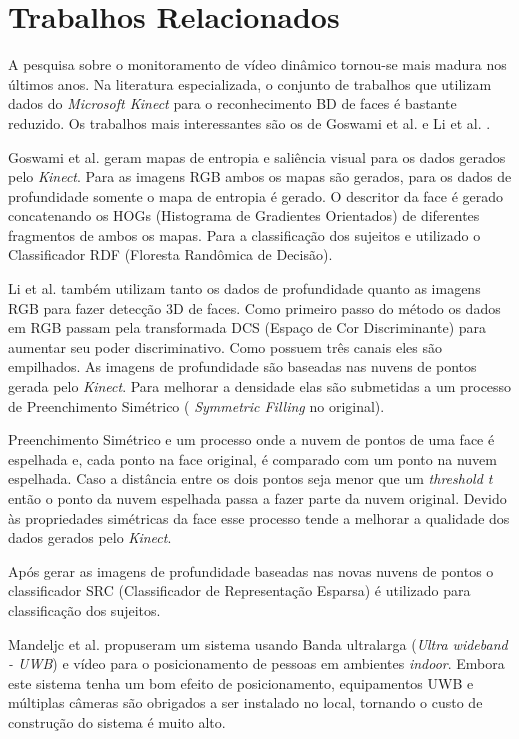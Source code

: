 \section{Trabalhos Relacionados}\label{sec:trabalhos-relacionados}

A pesquisa sobre o monitoramento de vídeo dinâmico tornou-se mais madura nos últimos anos. Na literatura especializada, o conjunto de trabalhos que utilizam dados do
\textit{Microsoft Kinect} para o reconhecimento BD de faces é bastante reduzido. Os trabalhos mais interessantes são os de Goswami et al. \cite{goswami2013rgb} e Li et al. \cite{li2013using}.

Goswami et al. \cite{goswami2013rgb} geram mapas de entropia e saliência visual para os dados gerados pelo \textit{Kinect}. Para as imagens RGB ambos os mapas são gerados, para os dados de profundidade somente o mapa de entropia é gerado. O descritor da face é gerado concatenando os HOGs (Histograma de Gradientes Orientados) de diferentes fragmentos de ambos os mapas. Para a classificação dos sujeitos e utilizado o Classificador RDF (Floresta Randômica de Decisão).
 
Li et al. \cite{goswami2013rgb} também utilizam tanto os dados de profundidade quanto as imagens RGB para fazer detecção 3D de faces. Como primeiro passo do método os dados em RGB passam pela transformada DCS (Espaço de Cor Discriminante) para aumentar seu poder discriminativo. Como possuem três canais eles são empilhados. As imagens de profundidade são baseadas nas nuvens de pontos gerada pelo  \textit{Kinect}. Para melhorar a densidade elas são submetidas a um processo de Preenchimento Simétrico ( \textit{Symmetric Filling} no original).
 
Preenchimento Simétrico e um processo onde a nuvem de pontos de uma face é espelhada e, cada ponto na face original, é comparado com um ponto na nuvem espelhada. Caso a distância entre os dois pontos seja menor que um  \textit{threshold t} então o ponto da nuvem espelhada passa a fazer parte da nuvem original. Devido às propriedades simétricas da face esse processo tende a melhorar a qualidade dos dados gerados pelo \textit{Kinect}.
 
Após gerar as imagens de profundidade baseadas nas novas nuvens de pontos o classificador SRC (Classificador de Representação Esparsa) é utilizado para classificação dos sujeitos.
 
Mandeljc et al. \cite{mandeljc2012tracking} propuseram um sistema usando Banda ultralarga (\textit{Ultra wideband - UWB}) e vídeo para o posicionamento de pessoas em ambientes \textit{indoor}. Embora este sistema tenha um bom efeito de posicionamento, equipamentos UWB e múltiplas câmeras são obrigados a ser instalado no local, tornando o custo de construção do sistema é muito alto.

